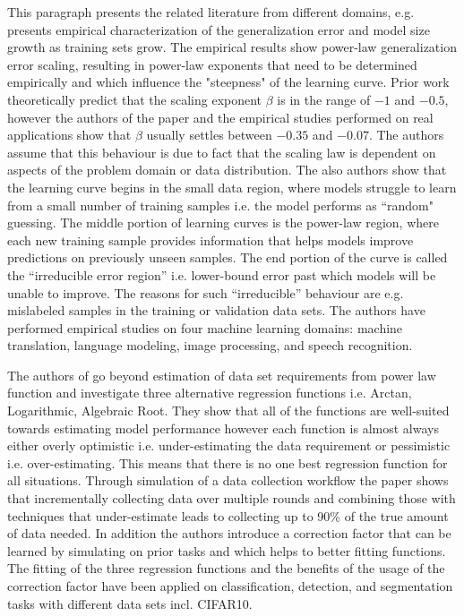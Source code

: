 \documentclass{article} %
\begin{document}
This paragraph presents the related literature from different domains, e.g. \cite{hestness2017deep} presents empirical characterization of the generalization error and model size growth as training sets grow.  The empirical results show power-law generalization error scaling, resulting in power-law exponents that need to be determined empirically and which influence the "steepness" of the learning curve. Prior work theoretically predict that the scaling exponent $\beta$ is in the range of $-1$ and $-0.5$, however the authors of the paper and the empirical studies performed on real applications show that $\beta$ usually settles between $-0.35$ and $-0.07$. The authors assume that this behaviour is due to fact that the scaling law is dependent on aspects of the problem domain or data distribution. The also authors show that the learning curve begins in the small data region, where models struggle to learn from a small number of training samples i.e. the model performs as “random" guessing. The middle portion of learning curves is the power-law region, where each new training sample provides information that helps models improve predictions on previously unseen samples. The end portion of the curve is called the “irreducible error region” i.e. lower-bound error past which models will be unable to improve. The reasons for such “irreducible” behaviour are e.g. mislabeled samples in the training or validation data sets. The authors have performed empirical studies on four machine learning domains: machine translation, language modeling, image processing, and speech recognition.

The authors of \cite{mahmood2022data} go beyond estimation of data set requirements from power law function and investigate three alternative regression functions i.e. Arctan, Logarithmic, Algebraic Root. They show that all of the functions are well-suited towards estimating model performance however each function is almost always either overly optimistic i.e. under-estimating the data requirement or pessimistic i.e. over-estimating. This means that there is no one best regression function for all situations. Through simulation of a data collection workflow the paper shows that incrementally collecting data over multiple rounds and combining those with techniques that under-estimate leads to collecting up to 90\% of the true amount of data needed. In addition the authors introduce a correction factor that can be learned by simulating on prior tasks and which helps to better fitting functions. The fitting of the three regression functions and the benefits of the usage of the correction factor have been applied on classification, detection, and segmentation tasks with different data sets incl. CIFAR10.
\end{document}
